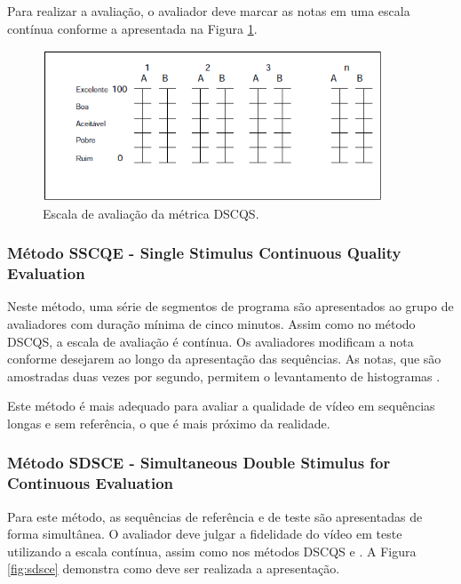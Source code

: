 Para realizar a avaliação, o avaliador deve marcar as notas em uma escala contínua conforme a apresentada na Figura \ref{fig:dscqsescala}.

\begin{figure}[!htb]
	\centering
	\includegraphics[width=0.9\textwidth]{./imgs/dscqsescala.png}
	\caption{Escala de avaliação da métrica DSCQS.}
	\label{fig:dscqsescala}
\end{figure}

\subsubsection[Método SSCQE]{Método SSCQE - Single Stimulus Continuous Quality Evaluation}

Neste método, uma série de segmentos de programa são apresentados ao grupo de avaliadores com duração mínima de cinco minutos. Assim como no método DSCQS, a escala de avaliação é contínua. Os avaliadores modificam a nota conforme desejarem ao longo da apresentação das sequências. As notas, que são amostradas duas vezes por segundo, permitem o levantamento de histogramas \cite{rehme}.

Este método é mais adequado para avaliar a qualidade de vídeo em sequências longas e sem referência, o que é mais próximo da realidade.

\subsubsection[Método SDSCE]{Método SDSCE - Simultaneous Double Stimulus for Continuous Evaluation}

Para este método, as sequências de referência e de teste são apresentadas de forma simultânea. O avaliador deve julgar a fidelidade do vídeo em teste utilizando a escala contínua, assim como nos métodos DSCQS e . A Figura \ref{fig:sdsce} demonstra como deve ser realizada a apresentação.

